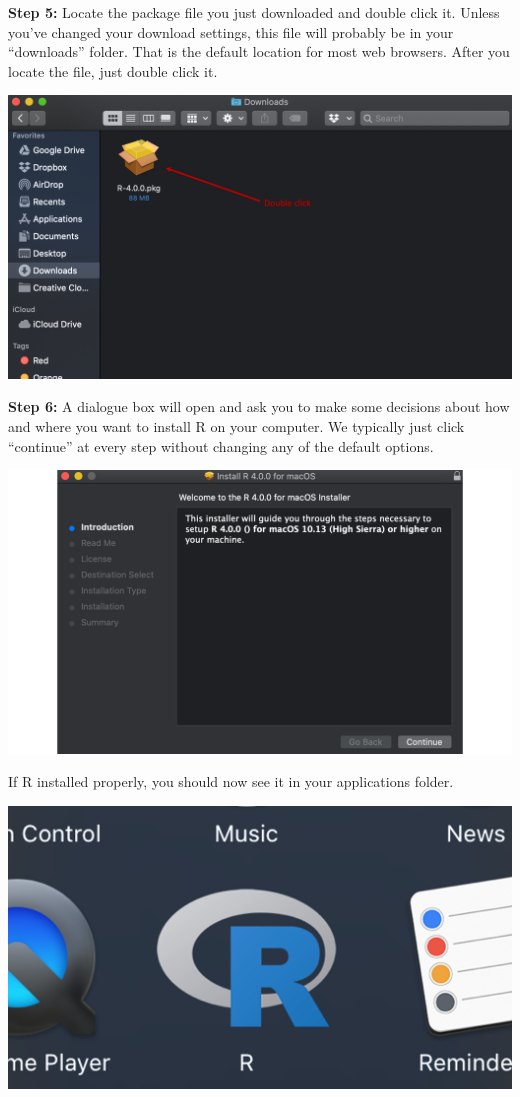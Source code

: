 \documentclass[
  letterpaper,
  DIV=11,
  numbers=noendperiod]{scrreprt}
\begin{document}
\textbf{Step 5:} Locate the package file you just downloaded and double
click it. Unless you've changed your download settings, this file will
probably be in your ``downloads'' folder. That is the default location
for most web browsers. After you locate the file, just double click it.

\includegraphics{chapters/installing_r_and_rstudio/mac_install_r1.png}

\textbf{Step 6:} A dialogue box will open and ask you to make some
decisions about how and where you want to install R on your computer. We
typically just click ``continue'' at every step without changing any of
the default options.

\includegraphics{chapters/installing_r_and_rstudio/mac_install_r2.png}

If R installed properly, you should now see it in your applications
folder.

\includegraphics{chapters/installing_r_and_rstudio/mac_view_r.png}
\end{document}
